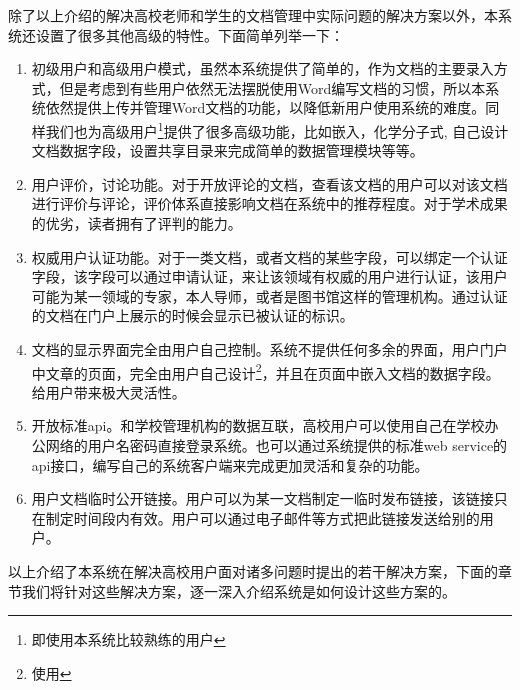 除了以上介绍的解决高校老师和学生的文档管理中实际问题的解决方案以外，本系统还设置了很多其他高级的特性。下面简单列举一下：
\begin{enumerate}
\item  初级用户和高级用户模式，虽然本系统提供了简单的，作为文档的主要录入方式，但是考虑到有些用户依然无法摆脱使用Word编写文档的习惯，所以本系统依然提供上传并管理Word文档的功能，以降低新用户使用系统的难度。同样我们也为高级用户\footnote{即使用本系统比较熟练的用户}提供了很多高级功能，比如嵌入，化学分子式, 自己设计文档数据字段，设置共享目录来完成简单的数据管理模块等等。
\item 用户评价，讨论功能。对于开放评论的文档，查看该文档的用户可以对该文档进行评价与评论，评价体系直接影响文档在系统中的推荐程度。对于学术成果的优劣，读者拥有了评判的能力。
\item 权威用户认证功能。对于一类文档，或者文档的某些字段，可以绑定一个认证字段，该字段可以通过申请认证，来让该领域有权威的用户进行认证，该用户可能为某一领域的专家，本人导师，或者是图书馆这样的管理机构。通过认证的文档在门户上展示的时候会显示已被认证的标识。
\item 文档的显示界面完全由用户自己控制。系统不提供任何多余的界面，用户门户中文章的页面，完全由用户自己设计\footnote{使用}，并且在页面中嵌入文档的数据字段。给用户带来极大灵活性。
\item 开放标准api。和学校管理机构的数据互联，高校用户可以使用自己在学校办公网络的用户名密码直接登录系统。也可以通过系统提供的标准web service的api接口，编写自己的系统客户端来完成更加灵活和复杂的功能。
\item 用户文档临时公开链接。用户可以为某一文档制定一临时发布链接，该链接只在制定时间段内有效。用户可以通过电子邮件等方式把此链接发送给别的用户。
\end{enumerate}
以上介绍了本系统在解决高校用户面对诸多问题时提出的若干解决方案，下面的章节我们将针对这些解决方案，逐一深入介绍系统是如何设计这些方案的。
